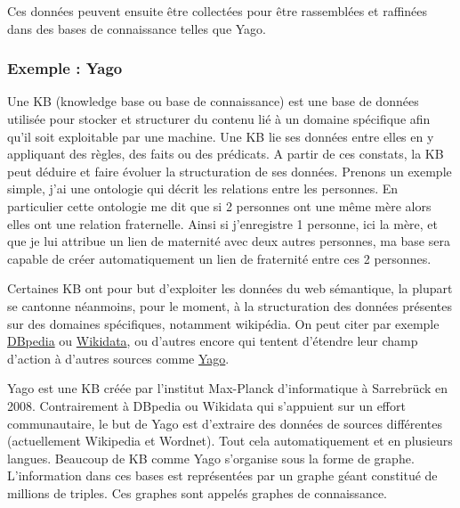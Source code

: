 Ces données peuvent ensuite être collectées pour être rassemblées et raffinées dans des bases de connaissance telles que Yago.

\subsubsection{Exemple : Yago}

Une KB (knowledge base ou base de connaissance) est une base de données utilisée pour stocker et structurer du contenu lié à un domaine spécifique afin qu'il soit exploitable par une machine. Une KB lie ses données entre elles en y appliquant des règles, des faits ou des prédicats. A partir de ces constats, la KB peut déduire et faire évoluer la structuration de ses données. Prenons un exemple simple, j'ai une ontologie qui décrit les relations entre les personnes. En particulier cette ontologie me dit que si 2 personnes ont une même mère alors elles ont une relation fraternelle. Ainsi si j'enregistre 1 personne, ici la mère, et que je lui attribue un lien de maternité avec deux autres personnes, ma base sera capable de créer automatiquement un lien de fraternité entre ces 2 personnes.

Certaines KB ont pour but d'exploiter les données du web sémantique, la plupart se cantonne néanmoins, pour le moment, à la structuration des données présentes sur des domaines spécifiques, notamment wikipédia. On peut citer par exemple \href{http://wiki.dbpedia.org/about}{DBpedia} ou \href{https://www.wikidata.org/wiki/Wikidata:Main_Page}{Wikidata}, ou d'autres encore qui tentent d'étendre leur champ d'action à d'autres sources comme \href{http://www.mpi-inf.mpg.de/departments/databases-and-information-systems/research/yago-naga/yago/}{Yago}.

Yago est une KB créée par l'institut Max-Planck d'informatique à Sarrebrück en 2008. Contrairement à DBpedia ou Wikidata qui s'appuient sur un effort communautaire, le but de Yago est d'extraire des données de sources différentes (actuellement Wikipedia et Wordnet). Tout cela automatiquement et en plusieurs langues. Beaucoup de KB comme Yago s'organise sous la forme de graphe. L'information dans ces bases est représentées par un graphe géant constitué de millions de triples. Ces graphes sont appelés graphes de connaissance.

